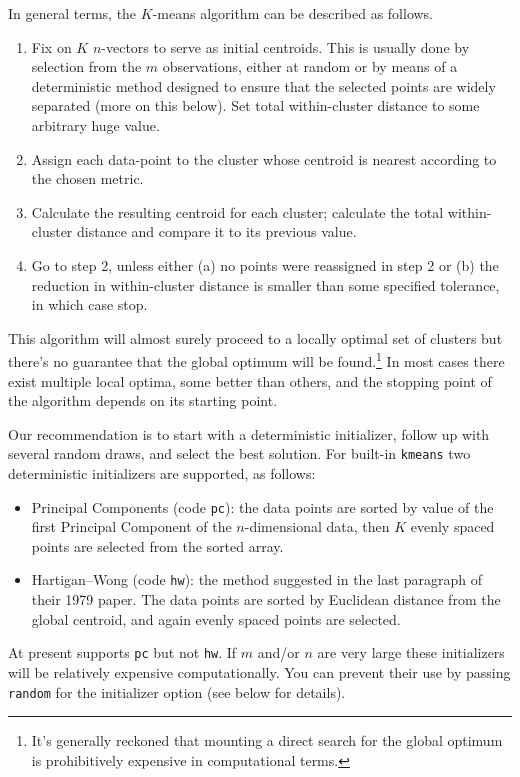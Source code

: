 \documentclass{article}
\begin{document}
In general terms, the $K$-means algorithm can be described as follows.
\begin{enumerate}
\item Fix on $K$ $n$-vectors to serve as initial centroids. This is
  usually done by selection from the $m$ observations, either at random
  or by means of a deterministic method designed to ensure that the
  selected points are widely separated (more on this below). Set
  total within-cluster distance to some arbitrary huge value.
\item Assign each data-point to the cluster whose centroid is nearest
  according to the chosen metric.
\item Calculate the resulting centroid for each cluster; calculate the
  total within-cluster distance and compare it to its previous value.
\item Go to step 2, unless either (a) no points were reassigned in step
  2 or (b) the reduction in within-cluster distance is smaller than some
  specified tolerance, in which case stop.
\end{enumerate}

This algorithm will almost surely proceed to a locally optimal set of
clusters but there's no guarantee that the global optimum will be
found.\footnote{It's generally reckoned that mounting a direct search
  for the global optimum is prohibitively expensive in computational
  terms.} In most cases there exist multiple local optima, some better
than others, and the stopping point of the algorithm depends on its
starting point.

Our recommendation is to start with a deterministic initializer, follow
up with several random draws, and select the best solution.  For
built-in \texttt{kmeans} two deterministic initializers are supported,
as follows:
\begin{itemize}
\item Principal Components (code \texttt{pc}): the data points are
  sorted by value of the first Principal Component of the
  $n$-dimensional data, then $K$ evenly spaced points are selected from
  the sorted array.
\item Hartigan--Wong (code \texttt{hw}): the method suggested in the
  last paragraph of their 1979 paper. The data points are sorted by
  Euclidean distance from the global centroid, and again evenly spaced
  points are selected.
\end{itemize}

At present  supports \texttt{pc} but not \texttt{hw}.
If $m$ and/or $n$ are very large these initializers will be relatively
expensive computationally. You can prevent their use by passing
\texttt{random} for the initializer option (see below for details).
\end{document}
